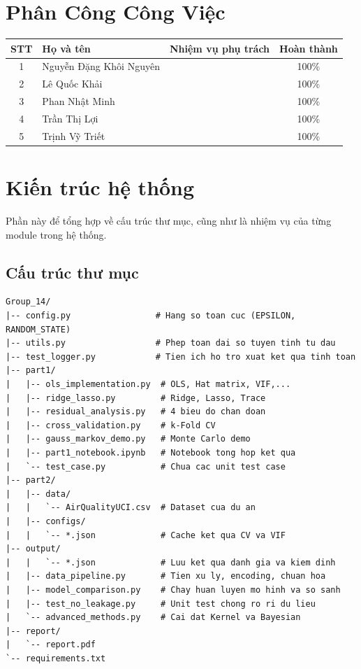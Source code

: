 \documentclass[12pt,a4paper]{report}
\newcommand{\theadcolor}{\rowcolor{tableheader}}
\begin{document}
\tableofcontents
\clearpage

\chapter{Phân Công Công Việc}

\begin{center}
\begin{tabular}{|c|p{5cm}|p{6cm}|c|}
\hline
\theadcolor \textbf{STT} & \textbf{Họ và tên} & \textbf{Nhiệm vụ phụ trách} & \textbf{Hoàn thành} \\
\hline
1 & \raggedright Nguyễn Đặng Khôi Nguyên & & 100\% \\
\hline
2 & Lê Quốc Khải & & 100\% \\
\hline
3 & Phan Nhật Minh & & 100\% \\
\hline
4 & Trần Thị Lợi & & 100\% \\
\hline
5 & Trịnh Vỹ Triết & & 100\% \\
\hline
\end{tabular}
\end{center}

\clearpage
\chapter{Kiến trúc hệ thống}
Phần này để tổng hợp về cấu trúc thư mục, cũng như là nhiệm vụ của từng module trong hệ thống. 
\section{Cấu trúc thư mục}
\begin{tcolorbox}[
  colback=white,
  colframe=black,
  arc=4pt,
  boxrule=0.6pt,
  left=12pt, right=12pt, top=8pt, bottom=8pt
]
\begin{lstlisting}[language={}, basicstyle=\ttfamily\small, frame=none, backgroundcolor=\color{white}]
Group_14/
|-- config.py                 # Hang so toan cuc (EPSILON, RANDOM_STATE)
|-- utils.py                  # Phep toan dai so tuyen tinh tu dau
|-- test_logger.py            # Tien ich ho tro xuat ket qua tinh toan
|-- part1/
|   |-- ols_implementation.py  # OLS, Hat matrix, VIF,...
|   |-- ridge_lasso.py         # Ridge, Lasso, Trace
|   |-- residual_analysis.py   # 4 bieu do chan doan
|   |-- cross_validation.py    # k-Fold CV
|   |-- gauss_markov_demo.py   # Monte Carlo demo
|   |-- part1_notebook.ipynb   # Notebook tong hop ket qua
|   `-- test_case.py           # Chua cac unit test case
|-- part2/
|   |-- data/
|   |   `-- AirQualityUCI.csv  # Dataset cua du an
|   |-- configs/
|   |   `-- *.json             # Cache ket qua CV va VIF
|-- output/
|   |   `-- *.json             # Luu ket qua danh gia va kiem dinh
|   |-- data_pipeline.py       # Tien xu ly, encoding, chuan hoa
|   |-- model_comparison.py    # Chay huan luyen mo hinh va so sanh
|   |-- test_no_leakage.py     # Unit test chong ro ri du lieu
|   `-- advanced_methods.py    # Cai dat Kernel va Bayesian
|-- report/
|   `-- report.pdf
`-- requirements.txt
\end{lstlisting}
\end{tcolorbox}
\end{document}
